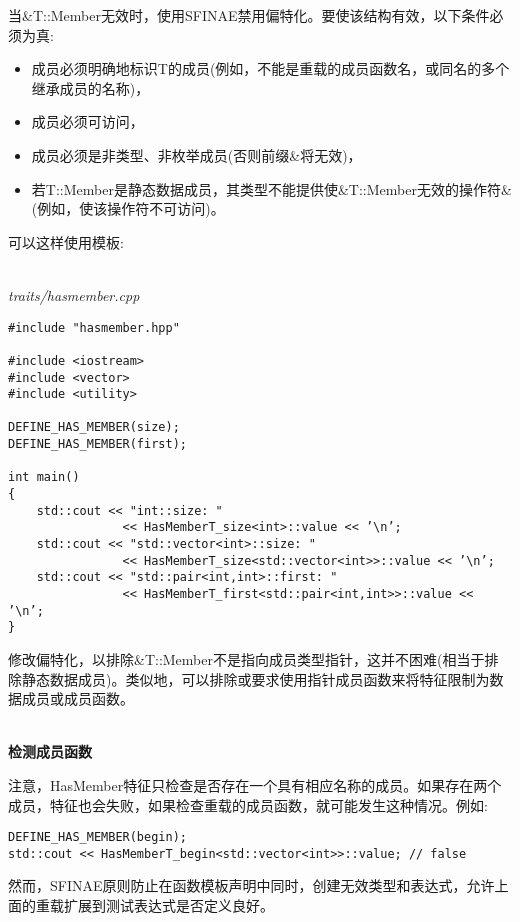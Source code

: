 当\&T::Member无效时，使用SFINAE禁用偏特化。要使该结构有效，以下条件必须为真:

\begin{itemize}
\item
成员必须明确地标识T的成员(例如，不能是重载的成员函数名，或同名的多个继承成员的名称)，

\item
成员必须可访问，

\item
成员必须是非类型、非枚举成员(否则前缀\&将无效)，

\item
若T::Member是静态数据成员，其类型不能提供使\&T::Member无效的操作符\&(例如，使该操作符不可访问)。
\end{itemize}

可以这样使用模板:

\hspace*{\fill} \\ %
\noindent
\textit{traits/hasmember.cpp}
\begin{lstlisting}[style=styleCXX]
#include "hasmember.hpp"

#include <iostream>
#include <vector>
#include <utility>

DEFINE_HAS_MEMBER(size);
DEFINE_HAS_MEMBER(first);

int main()
{
	std::cout << "int::size: "
				<< HasMemberT_size<int>::value << ’\n’;
	std::cout << "std::vector<int>::size: "
				<< HasMemberT_size<std::vector<int>>::value << ’\n’;
	std::cout << "std::pair<int,int>::first: "
				<< HasMemberT_first<std::pair<int,int>>::value << ’\n’;
}
\end{lstlisting}

修改偏特化，以排除\&T::Member不是指向成员类型指针，这并不困难(相当于排除静态数据成员)。类似地，可以排除或要求使用指针成员函数来将特征限制为数据成员或成员函数。

\hspace*{\fill} \\ %
\noindent
\textbf{检测成员函数}

注意，HasMember特征只检查是否存在一个具有相应名称的成员。如果存在两个成员，特征也会失败，如果检查重载的成员函数，就可能发生这种情况。例如:

\begin{lstlisting}[style=styleCXX]
DEFINE_HAS_MEMBER(begin);
std::cout << HasMemberT_begin<std::vector<int>>::value; // false
\end{lstlisting}

然而，SFINAE原则防止在函数模板声明中同时，创建无效类型和表达式，允许上面的重载扩展到测试表达式是否定义良好。

